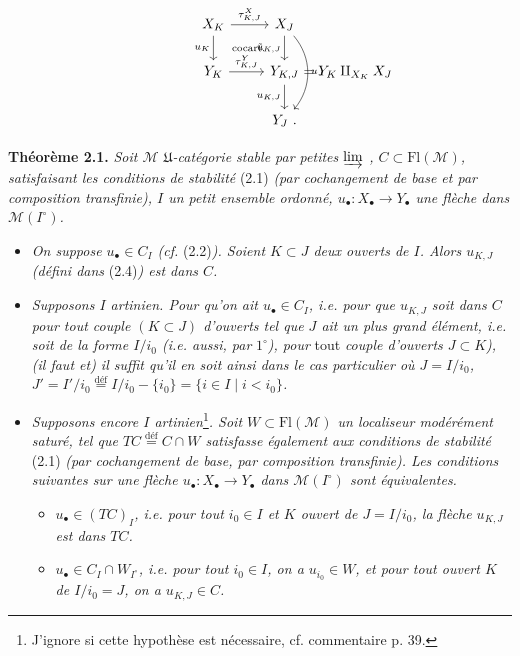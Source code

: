 \documentclass[11pt]{article}
\newcommand{\msp}[1]{\marginpar{\footnotesize [#1]}}
\newcommand{\Fl}{\mathrm{Fl}}
\newcommand{\M}{\mathcal{M}}
\begin{document}
\msp{page 26}

\[
\begin{tikzcd}
X_K \arrow[r, "\tau^X_{K,J}"] \arrow[d, "u_K"'] \arrow[dr, phantom, "\text{\scriptsize cocart.}"] & X_J \arrow[d, "\tilde{u}_{K,J}"'] \arrow[dd, bend left=40, "u_J"] \\
Y_K \arrow[r, "\tau^Y_{K,J}"] & Y_{K,J} \rlap{$\ = Y_K \amalg_{X_K} X_J$} \arrow[d, "u_{K,J}"'] \\
 & Y_J \ .
\end{tikzcd}
\]

\textbf{Théorème 2.1.} \textit{Soit $\M$ $\mathfrak{U}$-catégorie stable par petites $\varinjlim$ , $C \subset \Fl(\M)$, satisfaisant les conditions de stabilité} \textup{(2.1)} \textit{(par cochangement de base et par composition transfinie), $I$ un petit ensemble ordonné, $u_\bullet : X_\bullet \longrightarrow Y_\bullet$ une flèche dans $\M(I^\circ)$.}
\begin{itemize}[leftmargin=3em]
\item[$1^\circ$)] \textit{On suppose $u_\bullet \in C_I$ (cf.} \textup{(2.2)}\textit{). Soient $K \subset J$ deux ouverts de $I$. Alors $u_{K,J}$ (défini dans} \textup{(2.4)}\textit{) est dans $C$.}
\item[$2^\circ$)] \textit{Supposons $I$ artinien. Pour qu'on ait $u_\bullet \in C_I$, i.e. pour que $u_{K,J}$ soit dans $C$ pour tout couple $(K \subset J)$ d'ouverts tel que $J$ ait un plus grand élément, i.e. soit de la forme $I/i_0$ (i.e. aussi, par} $1^\circ$\textit{), pour} \textup{tout} \textit{couple d'ouverts $J \subset K$), (il faut et) il suffit qu'il en soit ainsi dans le cas particulier où $J = I/i_0$, $J' = I'/i_0 \overset{\text{déf}}{=} I/i_0 - \{i_0\} = \{i \in I \mid i < i_0\}$.}

\msp{page 27}
\item[$3^\circ$)] \textit{Supposons encore $I$ artinien}\footnote[11]{J'ignore si cette hypothèse est nécessaire, cf. commentaire p. 39.}\textit{. Soit $W \subset \Fl(\M)$ un localiseur modérément saturé, tel que $TC \overset{\text{déf}}{=} C \cap W$ satisfasse également aux conditions de stabilité} \textup{(2.1)} \textit{(par cochangement de base, par composition transfinie). Les conditions suivantes sur une flèche $u_\bullet : X_\bullet \longrightarrow Y_\bullet$ dans $\M(I^\circ)$ sont équivalentes.}
\begin{itemize}[leftmargin=2em]
\item[a)] \textit{$u_\bullet \in (TC)_I$, i.e. pour tout $i_0 \in I$ et $K$ ouvert de $J = I/i_0$, la flèche $u_{K,J}$ est dans $TC$.}
\item[b)] \textit{$u_\bullet \in C_I \cap W_{I^\circ}$, i.e. pour tout $i_0 \in I$, on a $u_{i_0} \in W$, et pour tout ouvert $K$ de $I/i_0 = J$, on a $u_{K,J} \in C$.}
\end{itemize}
\end{itemize}
\end{document}
